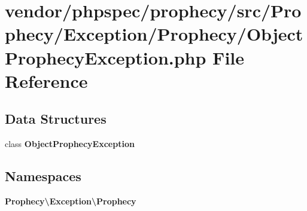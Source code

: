 \section{vendor/phpspec/prophecy/src/\+Prophecy/\+Exception/\+Prophecy/\+Object\+Prophecy\+Exception.php File Reference}
\label{_object_prophecy_exception_8php}
\subsection*{Data Structures}
\begin{DoxyCompactItemize}
\item 
class {\bf Object\+Prophecy\+Exception}
\end{DoxyCompactItemize}
\subsection*{Namespaces}
\begin{DoxyCompactItemize}
\item 
 {\bf Prophecy\textbackslash{}\+Exception\textbackslash{}\+Prophecy}
\end{DoxyCompactItemize}
